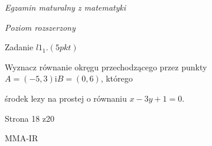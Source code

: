 \documentclass[a4paper,12pt]{article}
\begin{document}
{\it Egzamin maturalny z matematyki}

{\it Poziom rozszerzony}

Zadanie $l1_{1}. (5pkt)$

Wyznacz równanie okręgu przechodzącego przez punkty $A=(-5,3) \mathrm{i} B=(0,6)$, którego

środek lezy na prostej o równaniu $x-3y+1=0.$

Strona 18 z20

MMA-IR
\end{document}
